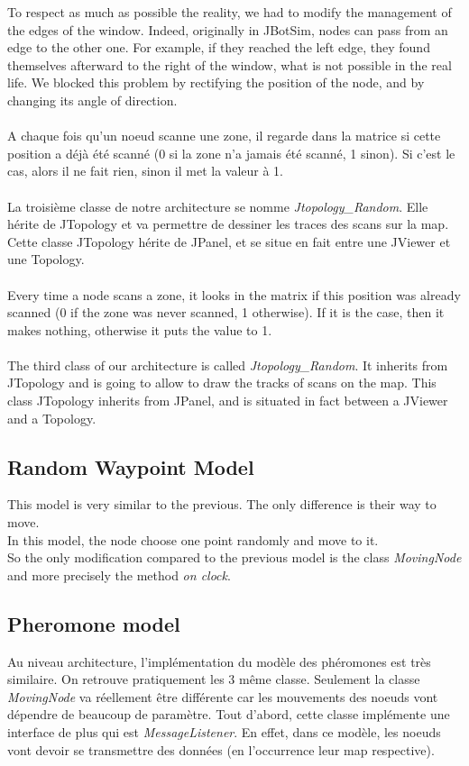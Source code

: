 To respect as much as possible the reality, we had to modify the management of the edges of the window. Indeed, originally in JBotSim, nodes can pass from an edge to the other one. For example, if they reached the left edge, they found themselves afterward to the right of the window, what is not possible in the real life. We blocked this problem by rectifying the position of the node, and by changing its angle of direction. \\\\

A chaque fois qu'un noeud scanne une zone, il regarde dans la matrice si cette position a déjà été scanné (0 si la zone n'a jamais été scanné, 1 sinon). Si c'est le cas, alors il ne fait rien, sinon il met la valeur à 1.\\\\

La troisième classe de notre architecture se nomme \textit{Jtopology\_Random}. Elle hérite de JTopology et va permettre de dessiner les traces des scans sur la map. Cette classe JTopology hérite de JPanel, et se situe en fait entre une JViewer et une Topology.\\\\

Every time a node scans a zone, it looks in the matrix if this position was already scanned (0 if the zone was never scanned, 1 otherwise). If it is the case, then it makes nothing, otherwise it puts the value to 1. \\\\

The third class of our architecture is called \textit{Jtopology\_Random}. It inherits from JTopology and is going to allow to draw the tracks of scans on the map. This class JTopology inherits from JPanel, and is situated in fact between a JViewer and a Topology.

\subsection{Random Waypoint Model}

This model is very similar to the previous. The only difference is their way to move. \\In this model, the node choose one point randomly and move to it. \\So the only modification compared to the previous model is the class \textit{MovingNode} and more precisely the method \textit{on clock}.


\subsection{Pheromone model}
Au niveau architecture, l'implémentation du modèle des phéromones est très similaire. On retrouve pratiquement les 3 même classe. Seulement la classe \textit{MovingNode} va réellement être différente car les mouvements des noeuds vont dépendre de beaucoup de paramètre. Tout d'abord, cette classe implémente une interface de plus qui est \textit{MessageListener}. En effet, dans ce modèle, les noeuds vont devoir se transmettre des données (en l'occurrence leur map respective).\\\\


